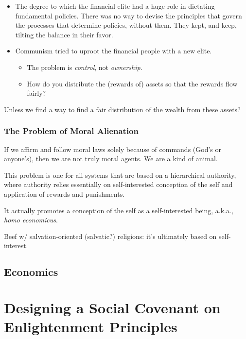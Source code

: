 \documentclass[
]{book}
\providecommand{\tightlist}{%
  \setlength{\itemsep}{0pt}\setlength{\parskip}{0pt}}
\begin{document}
\begin{itemize}
\item
  The degree to which the financial elite had a huge role in dictating fundamental policies. There was no way to devise the principles that govern the processes that determine policies, without them. They kept, and keep, tilting the balance in their favor.
\item
  Communism tried to uproot the financial people with a new elite.

  \begin{itemize}
  \tightlist
  \item
    The problem is \emph{control}, not \emph{ownership}.
  \item
    How do you distribute the (rewards of) assets so that the rewards flow fairly?
  \end{itemize}
\end{itemize}

Unless we find a way to find a fair distribution of the wealth from these assets?

\hypertarget{the-problem-of-moral-alienation}{%
\section{The Problem of Moral Alienation}\label{the-problem-of-moral-alienation}}

If we affirm and follow moral laws solely because of commands (God's or anyone's), then we are not truly moral agents. We are a kind of animal.

This problem is one for all systems that are based on a hierarchical authority, where authority relies essentially on self-interested conception of the self and application of rewards and punishments.

It actually promotes a conception of the self as a self-interested being, a.k.a., \emph{homo economicus}.

Beef w/ salvation-oriented (salvatic?) religions: it's ultimately based on self-interest.

\hypertarget{economics}{%
\chapter{Economics}\label{economics}}

\hypertarget{part-designing-a-social-covenant-on-enlightenment-principles}{%
\part{Designing a Social Covenant on Enlightenment Principles}\label{part-designing-a-social-covenant-on-enlightenment-principles}}
\end{document}
